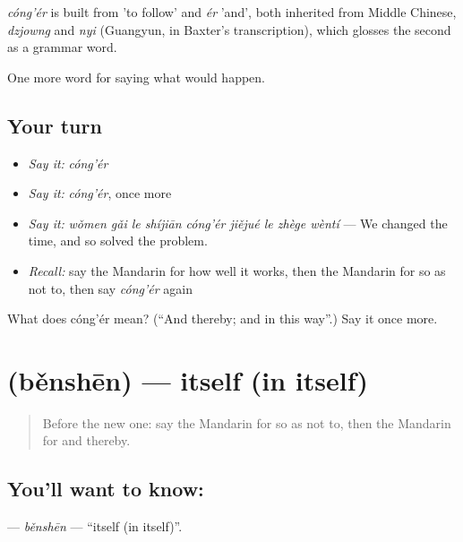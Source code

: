 \begin{cousinweb}
\emph{cóng'ér} is built from  'to follow' and \emph{ér} 'and', both inherited from Middle Chinese, \emph{dzjowng} and \emph{nyi} (Guangyun, in Baxter's transcription), which glosses the second as a grammar word.
\end{cousinweb}

\begin{grammarlens}[title={What you've built}]
One more word for saying what would happen.
\end{grammarlens}

\subsection*{Your turn}
\begin{itemize}
\raggedright
  \item \emph{Say it:} \emph{cóng'ér}
  \item \emph{Say it:} \emph{cóng'ér}, once more
  \item \emph{Say it:} \emph{wǒmen gǎi le shíjiān cóng'ér jiějué le zhège wèntí} — We changed the time, and so solved the problem.
  \item \emph{Recall:} say the Mandarin for how well it works, then the Mandarin for so as not to, then say \emph{cóng'ér} again
\end{itemize}

\begin{tcolorbox}[breakable,colback=teal!4,colframe=teal!35!black,title={Before you move on}]
What does cóng'ér mean? (\textquotedblleft{}And thereby; and in this way\textquotedblright{}.) Say it once more.
\end{tcolorbox}
\section[\texorpdfstring{\zh{本身} (běnshēn)}{本身 (běnshēn)}]{ (běnshēn) — itself (in itself)}

\label{lesson:ZH-C538-benshen}



\begin{quote}
Before the new one: say the Mandarin for so as not to, then the Mandarin for and thereby.
\end{quote}

\subsection*{You'll want to know: }
\textbf{} — \emph{běnshēn} — \textquotedblleft{}itself (in itself)\textquotedblright{}.

